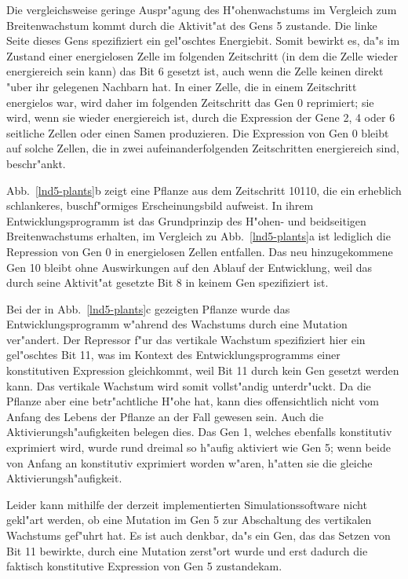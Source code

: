 Die vergleichsweise geringe Auspr"agung des H"ohenwachstums im Vergleich zum Breitenwachstum kommt durch die Aktivit"at
des Gens 5 zustande. Die linke Seite dieses Gens spezifiziert ein gel"oschtes Energiebit. Somit bewirkt es, da"s im
Zustand einer energielosen Zelle im folgenden Zeitschritt (in dem die Zelle wieder energiereich sein kann) das Bit
6 gesetzt ist, auch wenn die Zelle keinen direkt "uber ihr gelegenen Nachbarn hat. In einer Zelle, die in einem Zeitschritt
energielos war, wird daher im folgenden Zeitschritt das Gen 0 reprimiert; sie wird, wenn sie wieder energiereich ist,
durch die Expression der Gene 2, 4 oder 6 seitliche Zellen oder einen Samen produzieren. Die Expression von Gen 0 bleibt
auf solche Zellen, die in zwei aufeinanderfolgenden Zeitschritten energiereich sind, beschr"ankt.

Abb.\ \ref{lnd5-plants}b zeigt eine Pflanze aus dem Zeitschritt 10110, die ein erheblich schlankeres, buschf"ormiges
Erscheinungsbild aufweist. In ihrem Entwicklungsprogramm ist das Grundprinzip des H"ohen- und beidseitigen Breitenwachstums
erhalten, im Vergleich zu Abb.\ \ref{lnd5-plants}a ist lediglich die Repression von Gen 0 in energielosen Zellen entfallen.
Das neu hinzugekommene Gen 10 bleibt ohne Auswirkungen auf den Ablauf der Entwicklung, weil das durch seine Aktivit"at
gesetzte Bit 8 in keinem Gen spezifiziert ist.

Bei der in Abb.\ \ref{lnd5-plants}c gezeigten Pflanze wurde das Entwicklungsprogramm w"ahrend des Wachstums durch eine
Mutation ver"andert. Der Repressor f"ur das vertikale Wachstum spezifiziert hier ein gel"oschtes Bit 11, was im Kontext
des Entwicklungsprogramms einer konstitutiven Expression gleichkommt, weil Bit 11 durch kein Gen gesetzt werden kann.
Das vertikale Wachstum wird somit vollst"andig unterdr"uckt. Da die Pflanze aber eine betr"achtliche H"ohe hat, kann
dies offensichtlich nicht vom Anfang des Lebens der Pflanze an der Fall gewesen sein. Auch die Aktivierungsh"aufigkeiten
belegen dies. Das Gen 1, welches ebenfalls konstitutiv exprimiert wird, wurde rund dreimal so h"aufig aktiviert wie
Gen 5; wenn beide von Anfang an konstitutiv exprimiert worden w"aren, h"atten sie die gleiche Aktivierungsh"aufigkeit.

Leider kann mithilfe der derzeit implementierten Simulationssoftware nicht gekl"art werden, ob eine Mutation im Gen 5
zur Abschaltung des vertikalen Wachstums gef"uhrt hat. Es ist auch denkbar, da"s ein Gen, das das Setzen von Bit 11
bewirkte, durch eine Mutation zerst"ort wurde und erst dadurch die faktisch konstitutive Expression von Gen 5 zustandekam.

